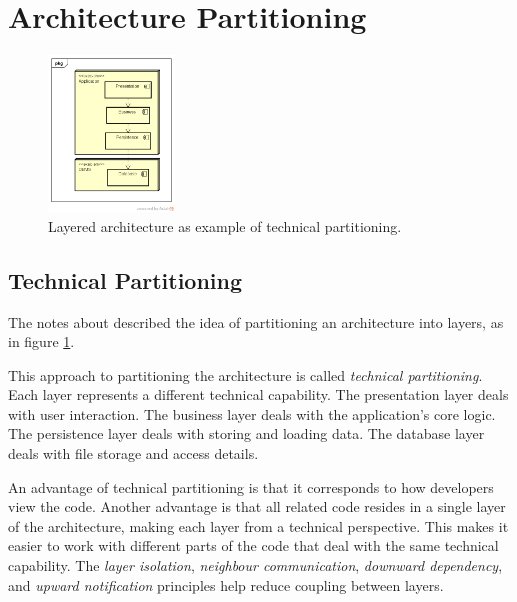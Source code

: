 \section{Architecture Partitioning}

\begin{figure}
    \vspace{-20pt}
    \centering
    \includegraphics[trim=74 58 40 41,clip,width=0.3\textwidth]{diagrams/technical-partitioning.png}
    \caption{Layered architecture as example of technical partitioning.}
    \label{fig:technical-partitioning}
\end{figure}

\subsection{Technical Partitioning}
The notes about 
described the idea of partitioning an architecture into layers, as in figure \ref{fig:technical-partitioning}.

This approach to partitioning the architecture is called \emph{technical partitioning}.
Each layer represents a different technical capability.
The presentation layer deals with user interaction.
The business layer deals with the application's core logic.
The persistence layer deals with storing and loading data.
The database layer deals with file storage and access details.

An advantage of technical partitioning is that it corresponds to how developers view the code.
Another advantage is that all related code resides in a single layer of the architecture, making each layer
 from a technical perspective.
This makes it easier to work with different parts of the code that deal with the same technical capability.
The \emph{layer isolation}, \emph{neighbour communication}, \emph{downward dependency},
and \emph{upward notification} principles help reduce coupling between layers.


